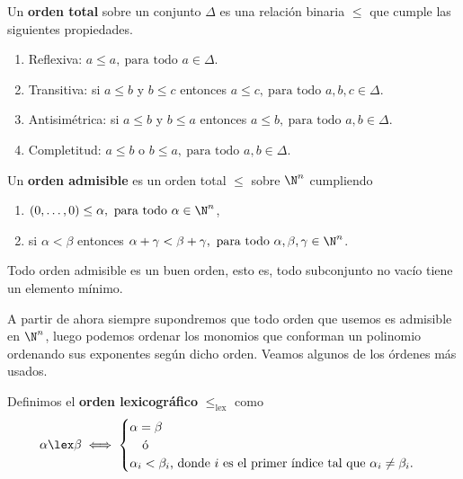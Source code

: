 \begin{definicion}
    Un \textbf{orden total} sobre un conjunto $\Delta$ es una relación binaria $\le$ que cumple las siguientes propiedades.
    \begin{enumerate}
        \item Reflexiva: $a\le a,\ \text{para todo } a\in \Delta$.
        \item Transitiva: si $a\le b$ y $b\le c$ entonces $a\le c,\ \text{para todo } a,b,c\in \Delta$.
        \item Antisimétrica: si $a\le b$ y $b\le a$ entonces $a\le b,\ \text{para todo } a,b\in \Delta$.
        \item Completitud: $a\le b$ o $b\le a,\ \text{para todo } a,b\in \Delta$.
    \end{enumerate}
\end{definicion}
\begin{definicion}
    Un \textbf{orden admisible} es un orden total $\le$ sobre $\N^n$ cumpliendo
    \begin{enumerate}
        \item $(0,\dots ,0) \le \alpha,\ \text{para todo } \alpha \in \N^n$,
        \item si $\alpha < \beta$ entonces $\alpha + \gamma < \beta + \gamma,\ \text{para todo } \alpha,\beta,\gamma \in \N^n$.
    \end{enumerate}
\end{definicion}
\begin{proposicion}
    Todo orden admisible es un buen orden, esto es, todo subconjunto no vacío tiene un elemento mínimo.
\end{proposicion}

A partir de ahora siempre supondremos que todo orden que usemos es admisible en $\N^n$, luego podemos ordenar los monomios que conforman un polinomio ordenando sus exponentes según dicho orden. Veamos algunos de los órdenes más usados. 

\begin{definicion}
    Definimos el \textbf{orden lexicográfico} $\le_{\text{lex}}$ como
    \begin{equation*}
        \alpha \lex \beta \iff \begin{cases}
            \alpha  = \beta \\
            \quad\text{ó}   \\
            \alpha_i < \beta_i \text{, donde $i$ es el primer índice tal que } \alpha_i \neq \beta_i.
        \end{cases}
    \end{equation*}
\end{definicion}

